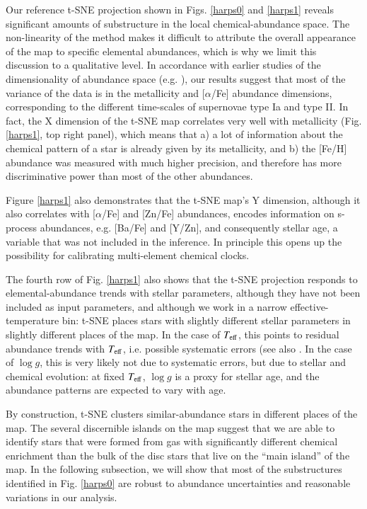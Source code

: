 \documentclass{aa}  %
\begin{document}
Our reference t-SNE projection shown in Figs. \ref{harps0} and \ref{harps1} reveals significant amounts of substructure in the local chemical-abundance space. The non-linearity of the method makes it difficult to attribute the overall appearance of the map to specific elemental abundances, which is why we limit this discussion to a qualitative level. In accordance with earlier studies of the dimensionality of abundance space (e.g. \citealt{Ting2012, Boesso2018}), our results suggest that most of the variance of the data is in the metallicity and [$\alpha$/Fe] abundance dimensions, corresponding to the different time-scales of supernovae type Ia and type II. In fact, the X dimension of the t-SNE map correlates very well with metallicity (Fig. \ref{harps1}, top right panel), which means that a) a lot of information about the chemical pattern of a star is already given by its metallicity, and b) the [Fe/H] abundance was measured with much higher precision, and therefore has more discriminative power than most of the other abundances. 

Figure \ref{harps1} also demonstrates that the t-SNE map's Y dimension, although it also correlates with [$\alpha$/Fe] and [Zn/Fe] abundances, encodes information on s-process abundances, e.g. [Ba/Fe] and [Y/Zn], and consequently stellar age, a variable that was not included in the inference. In principle this opens up the possibility for calibrating multi-element chemical clocks.%

The fourth row of Fig. \ref{harps1} also shows that the t-SNE projection responds to elemental-abundance trends with stellar parameters, although they have not been included as input parameters, and although we work in a narrow effective-temperature bin: t-SNE places stars with slightly different stellar parameters in slightly different places of the map. In the case of $T_{\rm eff}$, this points to residual abundance trends with $T_{\rm eff}$, i.e. possible systematic errors (see also \citealt{DelgadoMena2017}. In the case of $\log g$, this is very likely not due to systematic errors, but due to stellar and chemical evolution: at fixed $T_{\rm eff}$, $\log g$ is a proxy for stellar age, and the abundance patterns are expected to vary with age.

By construction, t-SNE clusters similar-abundance stars in different places of the map. The several discernible islands on the map suggest that we are able to identify stars that were formed from gas with significantly different chemical enrichment than the bulk of the disc stars that live on the ``main island'' of the map. In the following subsection, we will show that most of the substructures identified in Fig. \ref{harps0} are robust to abundance uncertainties and reasonable variations in our analysis.
\end{document}
